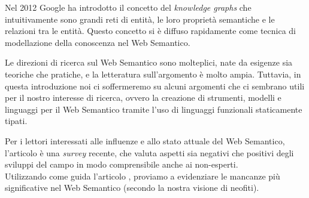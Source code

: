 Nel 2012 Google ha introdotto il concetto del \emph{knowledge graphs} che intuitivamente sono grandi reti di entità, le loro proprietà semantiche e le relazioni tra le entità. Questo concetto si è diffuso rapidamente come tecnica di modellazione della conoscenza nel Web Semantico.

Le direzioni di ricerca sul Web Semantico sono molteplici, nate da esigenze sia teoriche che pratiche, e la letteratura sull'argomento è molto ampia. Tuttavia, in questa introduzione noi ci soffermeremo su alcuni argomenti che ci sembrano utili per il nostro interesse di ricerca, ovvero la creazione di strumenti, modelli e linguaggi per il Web Semantico tramite l'uso di linguaggi funzionali staticamente tipati.

Per i lettori interessati alle influenze e allo stato attuale del Web Semantico, l'articolo \cite{hitzler2021review} è una \emph{survey} recente, che valuta aspetti sia negativi che positivi degli sviluppi del campo in modo comprensibile anche ai non-esperti.\\
Utilizzando come guida l'articolo \cite{hitzler2021review}, proviamo a evidenziare le mancanze più significative nel Web Semantico (secondo la nostra visione di neofiti).
